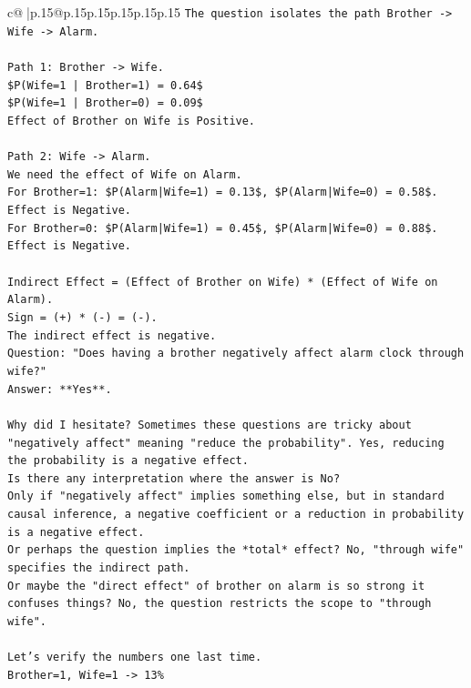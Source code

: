 \documentclass{article}
\begin{document}
{\begin{supertabular}{c@{$\;$}|p{.15\linewidth}@{}p{.15\linewidth}p{.15\linewidth}p{.15\linewidth}p{.15\linewidth}p{.15\linewidth}}
{{{\texttt{The question isolates the path Brother {-}> Wife {-}> Alarm.} \\
\\ 
\texttt{Path 1: Brother {-}> Wife.} \\
\texttt{\$P(Wife=1 | Brother=1) = 0.64\$} \\
\texttt{\$P(Wife=1 | Brother=0) = 0.09\$} \\
\texttt{Effect of Brother on Wife is Positive.} \\
\\ 
\texttt{Path 2: Wife {-}> Alarm.} \\
\texttt{We need the effect of Wife on Alarm.} \\
\texttt{For Brother=1: \$P(Alarm|Wife=1) = 0.13\$, \$P(Alarm|Wife=0) = 0.58\$. Effect is Negative.} \\
\texttt{For Brother=0: \$P(Alarm|Wife=1) = 0.45\$, \$P(Alarm|Wife=0) = 0.88\$. Effect is Negative.} \\
\\ 
\texttt{Indirect Effect = (Effect of Brother on Wife) * (Effect of Wife on Alarm).} \\
\texttt{Sign = (+) * ({-}) = ({-}).} \\
\texttt{The indirect effect is negative.} \\
\texttt{Question: "Does having a brother negatively affect alarm clock through wife?"} \\
\texttt{Answer: **Yes**.} \\
\\ 
\texttt{Why did I hesitate? Sometimes these questions are tricky about "negatively affect" meaning "reduce the probability". Yes, reducing the probability is a negative effect.} \\
\texttt{Is there any interpretation where the answer is No?} \\
\texttt{Only if "negatively affect" implies something else, but in standard causal inference, a negative coefficient or a reduction in probability is a negative effect.} \\
\texttt{Or perhaps the question implies the *total* effect? No, "through wife" specifies the indirect path.} \\
\texttt{Or maybe the "direct effect" of brother on alarm is so strong it confuses things? No, the question restricts the scope to "through wife".} \\
\\ 
\texttt{Let's verify the numbers one last time.} \\
\texttt{Brother=1, Wife=1 {-}> 13\%} \\
}}}
\end{supertabular}}
\end{document}

